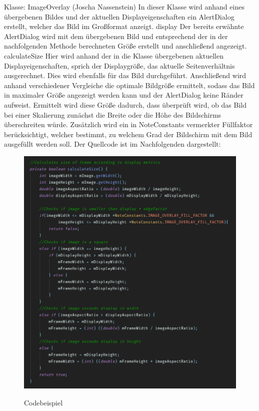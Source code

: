 Klasse: ImageOverlay (Joscha Nassenstein)
In dieser Klasse wird anhand eines übergebenen Bildes und der aktuellen Displayeigenschaften ein AlertDialog erstellt, welcher das Bild im Großformat anzeigt.
display
Der bereits erwähnte AlertDialog wird mit dem übergebenen Bild und entsprechend der in der nachfolgenden Methode berechneten Größe erstellt und anschließend angezeigt.
calculateSize
Hier wird anhand der in die Klasse übergebenen aktuellen Displayeigenschaften, sprich der Displaygröße, das aktuelle Seitenverhältnis ausgerechnet. Dies wird ebenfalls für das Bild durchgeführt. Anschließend wird anhand verschiedener Vergleiche die optimale Bildgröße ermittelt, sodass das Bild in maximaler Größe angezeigt werden kann und der AlertDialog keine Ränder aufweist. Ermittelt wird diese Größe dadurch, dass überprüft wird, ob das Bild bei einer Skalierung zunächst die Breite oder die Höhe des Bildschirms überschreiten würde. Zusätzlich wird ein in NoteConstants vermerkter Füllfaktor berücksichtigt, welcher bestimmt, zu welchem Grad der Bildschirm mit dem Bild ausgefüllt werden soll.
Der Quellcode ist im Nachfolgenden dargestellt:

\begin{figure}[H]
\centering
\begin{minipage}[t]{1\textwidth} %
\caption{Codebeispiel} %
\includegraphics[width=1 \textwidth]{img/note_imageOverlayCodeExample}\\ %
\end{minipage}
\end{figure}


